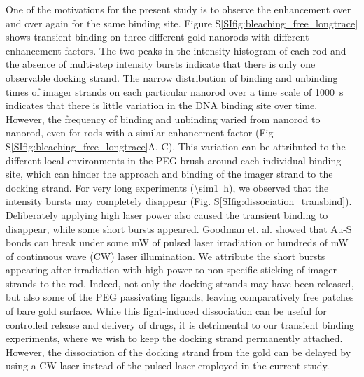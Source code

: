One of the motivations for the present study is to observe the enhancement over and over again for the same binding site.
Figure S\ref{SIfig:bleaching_free_longtrace} shows transient binding on three different gold nanorods with different enhancement factors.
The two peaks in the intensity histogram of each rod and the absence of multi-step intensity bursts indicate that there is only one observable docking strand.
The narrow distribution of binding and unbinding times of imager strands on each particular nanorod over a time scale of \SI{1000}{\s} indicates that there is little variation in the DNA binding site over time.
However, the frequency of binding and unbinding varied from nanorod to nanorod, even for rods with a similar enhancement factor (Fig S\ref{SIfig:bleaching_free_longtrace}A, C).
This variation can be attributed to the different local environments in the PEG brush around each individual binding site, which can hinder the approach and binding of the imager strand to the docking strand.
For very long experiments (\SI{\sim1}{\hour}), we observed that the intensity bursts may completely disappear (Fig. S\ref{SIfig:dissociation_transbind}).
Deliberately applying high laser power also caused the transient binding to disappear, while some short bursts appeared.
Goodman et. al.\cite{goodman2016understanding} showed that Au-S bonds can break under some mW of pulsed laser irradiation or hundreds of mW of continuous wave (CW) laser illumination.
We attribute the short bursts appearing after irradiation with high power to non-specific sticking of imager strands to the rod. Indeed, not only the docking strands may have been released, but also some of the PEG passivating ligands, leaving comparatively free patches of bare gold surface.
While this light-induced dissociation can be useful for controlled release and delivery of drugs, it is detrimental to our transient binding experiments, where we wish to keep the docking strand permanently attached.
However, the dissociation of the docking strand from the gold can be delayed by using a CW laser instead of the pulsed laser employed in the current study.


